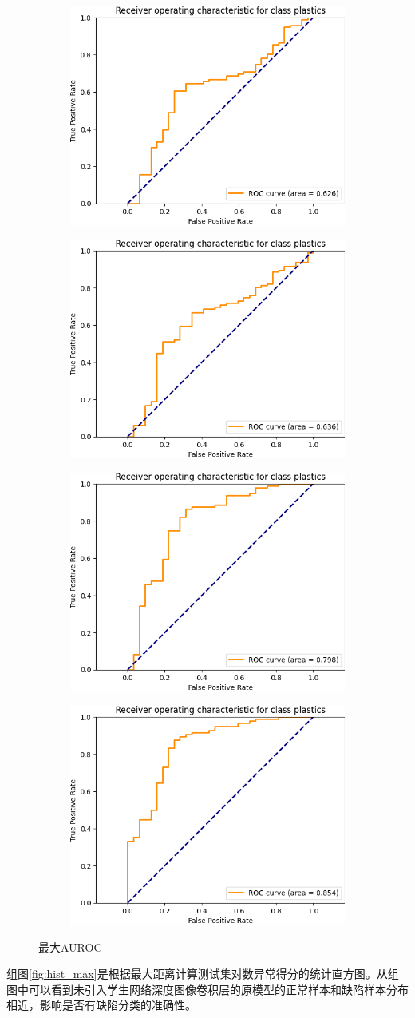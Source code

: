 \begin{figure}[htbp]
    \centering
    \begin{subfigure}
        \centering
        \includegraphics[width=.4\linewidth]{figures/4/auroc/ori_experiment/plastics_max.png}  
        \end{subfigure}
        \begin{subfigure}
        \centering
        \includegraphics[width=.4\linewidth]{figures/4/auroc/hog_experiment/plastics_max.png} 
        \end{subfigure}
        \begin{subfigure}
        \centering
        \includegraphics[width=.4\linewidth]{figures/4/auroc/mix_experiment/plastics_max.png} 
        \end{subfigure}
        \begin{subfigure}
        \centering
        \includegraphics[width=.4\linewidth]{figures/4/auroc/mixhog_experiment/plastics_max.png} 
        \end{subfigure}
    \caption{最大AUROC}
    \label{fig:auroc_max}
    \end{figure}
组图\ref{fig:hist_max}是根据最大距离计算测试集对数异常得分的统计直方图。从组图中可以看到未引入学生网络深度图像卷积层的原模型的正常样本和缺陷样本分布相近，影响是否有缺陷分类的准确性。


